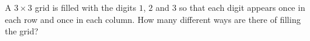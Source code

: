 A $3\times3$ grid is filled with the digits $1$, $2$ and $3$ so that each digit appears once in each row and once in each column. How many different ways are there of filling the grid?
